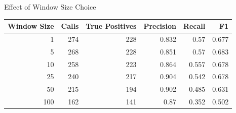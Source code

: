 \documentclass{beamer}
\begin{document}
\begin{frame}{Effect of Window Size Choice}
\vspace{2mm}
\tiny
\begin{tabular}{r|rrrrr}
 \hline
 Window Size & Calls & True Positives & Precision & Recall & F1 \\ 
 \hline
   1 & 274 & 228 & 0.832 & 0.57 & 0.677 \\ 
   5 & 268 & 228 & 0.851 & 0.57 & 0.683 \\ 
   10 & 258 & 223 & 0.864 & 0.557 & 0.678 \\ 
   25 & 240 & 217 & 0.904 & 0.542 & 0.678 \\ 
   50 & 215 & 194 & 0.902 & 0.485 & 0.631 \\ 
   100 & 162 & 141 & 0.87 & 0.352 & 0.502 \\  
\end{tabular}
\end{frame}
\end{document}
